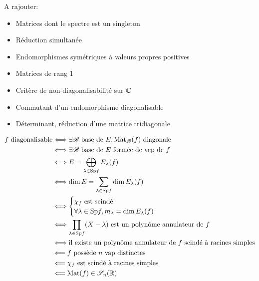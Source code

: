 A rajouter:
\begin{itemize}
    \item Matrices dont le spectre est un singleton
    \item Réduction simultanée
    \item Endomorphismes symétriques à valeurs propres positives
    \item Matrices de rang 1
    \item Critère de non-diagonalisabilité sur $\mathbb{C}$
    \item Commutant d'un endomorphisme diagonalisable 
    \item Déterminant, réduction d'une matrice tridiagonale 
\end{itemize}

\newpage

\def\colequi{teal}
\def\colimpli{orange}

\begin{Large}
\begin{align*}
    f \text{ diagonalisable} &\Longleftrightarrow \exists \mathscr{B} \text{ base de } E, \mathrm{Mat}_\mathscr{B}(f) \text{ diagonale} \\
    &\Longleftrightarrow \exists \mathscr{B} \text{ base de } E \text{ formée de vep de } f\\
    &\Longleftrightarrow E = \bigoplus_{\lambda \in \mathrm{Sp} f} E_\lambda(f) \\
    &\Longleftrightarrow \dim E = \sum_{\lambda \in \mathrm{Sp} f} \dim E_\lambda(f) \\
    &\Longleftrightarrow 
    \begin{cases}
    \chi_f \text{ est scindé} \\
    \forall \lambda \in \mathrm{Sp} f, m_{\lambda} = \dim E_\lambda(f)
    \end{cases} \\
    &\Longleftrightarrow \prod_{\lambda \in \mathrm{Sp} f}(X-\lambda) \text{ est un polynôme annulateur de } f\\
    &\Longleftrightarrow \text{il existe un polynôme annulateur de } f \text{ scindé à racines simples} \\
    &\Longleftarrow f \text{ possède } n \text{ vap distinctes} \\
    &\Longleftarrow \chi_f \text{ est scindé à racines simples} \\
    &\Longleftarrow \mathrm{Mat}(f) \in \mathscr{S}_n(\mathbb{R})
\end{align*}
\end{Large}
